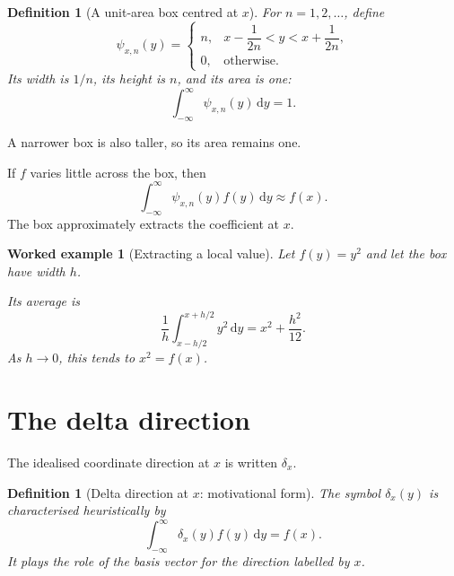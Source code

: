 \documentclass[11pt,a5paper,oneside,openany]{scrreprt}
\theoremstyle{notes}
\theoremstyle{definitions}
\newtheorem{definition}[theorem]{Definition}
\newtheorem{example}[theorem]{Worked example}
\newcommand{\dd}{\,\mathrm{d}}
\begin{document}
\begin{definition}[A unit-area box centred at $x$]
For $n=1,2,\ldots$, define
\[
 \psi_{x,n}(y)=
 \begin{cases}
 n,
 &x-\dfrac1{2n}<y<x+\dfrac1{2n},\\[2mm]
 0,
 &\text{otherwise}.
 \end{cases}
\]
Its width is $1/n$, its height is $n$, and its area is one:
\[
 \int_{-\infty}^{\infty}\psi_{x,n}(y)\dd y=1.
\]
\end{definition}

\begin{center}

{\small A narrower box is also taller, so its area remains one.}
\end{center}

If $f$ varies little across the box, then
\[
 \int_{-\infty}^{\infty}\psi_{x,n}(y)f(y)\dd y
 \approx f(x).
\]
The box approximately extracts the coefficient at $x$.

\begin{example}[Extracting a local value]
Let $f(y)=y^2$ and let the box have width $h$.

Its average is
\[
 \frac1h\int_{x-h/2}^{x+h/2}y^2\dd y
 =x^2+\frac{h^2}{12}.
\]
As $h\to0$, this tends to $x^2=f(x)$.
\end{example}

\section{The delta direction}

The idealised coordinate direction at $x$ is written $\delta_x$.

\begin{definition}[Delta direction at $x$: motivational form]
The symbol $\delta_x(y)$ is characterised heuristically by
\[
 \boxed{\int_{-\infty}^{\infty}
 \delta_x(y)f(y)\dd y=f(x).}
\]
It plays the role of the basis vector for the direction labelled by $x$.
\end{definition}
\end{document}
